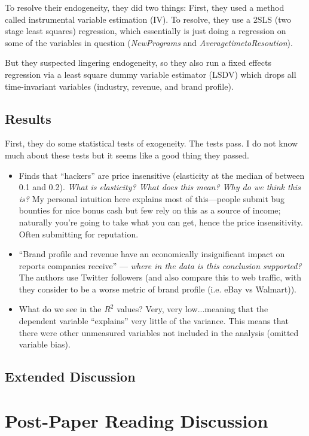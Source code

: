 \documentclass[11pt]{article}
\begin{document}
To resolve their endogeneity, they did two things: First, they used a method called instrumental variable estimation (IV). To resolve, they use a 2SLS (two stage least squares) regression, which essentially is just doing a regression on some of the variables in question ({\it NewPrograms} and {\it AveragetimetoResoution}).


But they suspected lingering endogeneity, so they also run a fixed effects regression via a least square dummy variable estimator (LSDV) which drops all time-invariant variables (industry, revenue, and brand profile).

\subsection{Results}

First, they do some statistical tests of exogeneity. The tests pass. I do not know much about these tests but it seems like a good thing they passed. 

\begin{itemize}
    \item Finds that ``hackers'' are price insensitive (elasticity at the median of between 0.1 and 0.2). {\it What is elasticity? What does this mean? Why do we think this is?} My personal intuition here explains most of this---people submit bug bounties for nice bonus cash but few rely on this as a source of income; naturally you're going to take what you can get, hence the price insensitivity. Often submitting for reputation.
    \item ``Brand profile and revenue have an economically insignificant impact on reports companies receive'' --- {\it where in the data is this conclusion supported?} The authors use Twitter followers (and also compare this to web traffic, with they consider to be a worse metric of brand profile (i.e. eBay vs Walmart)).
    \item What do we see in the $R^2$ values? Very, very low...meaning that the dependent variable ``explains'' very little of the variance. This means that there were other unmeasured variables not included in the analysis (omitted variable bias).
\end{itemize}


\subsection{Extended Discussion} 

\section{Post-Paper Reading Discussion} 
\end{document}
